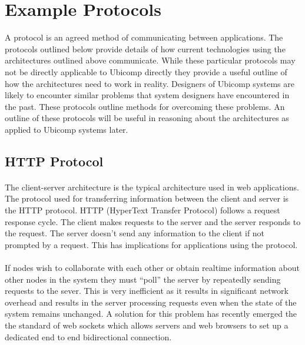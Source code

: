 \documentclass[11pt]{amsart}
\begin{document}
\section{Example Protocols}

A protocol is an agreed method of communicating between applications. The protocols outlined below provide details of how current technologies using the architectures outlined above communicate. While these particular protocols may not be directly applicable to Ubicomp directly they provide a useful outline of how the architectures need to work in reality. Designers of Ubicomp systems are likely to encounter similar problems that system designers have encountered in the past. These protocols outline methods for overcoming these problems. An outline of these protocols will be useful in reasoning about the architectures as applied to Ubicomp systems later.

\subsection{HTTP Protocol}
\paragraph{}
The client-server architecture is the typical architecture used in web applications. The protocol used for transferring information between the client and server is the HTTP protocol. HTTP (HyperText Transfer Protocol) follows a request response cycle. The client makes requests to the server and the server responds to the request. The server doesn't send any information to the client if not prompted by a request. This has implications for applications using the protocol. 
\paragraph{}
If nodes wish to collaborate with each other or obtain realtime information about other nodes in the system they must ``poll'' the server by repeatedly sending requests to the sever. This is very inefficient as it results in significant network overhead and results in the server processing requests even when the state of the system remains unchanged. A solution for this problem has recently emerged the the standard of web sockets which allows servers and web browsers to set up a dedicated end to end bidirectional connection.
\end{document}
